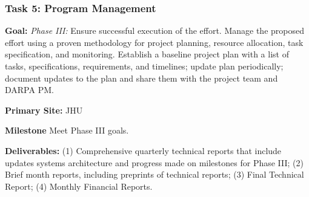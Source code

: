 \subsubsection{Task 5: Program Management}
\begin{compactitem}
\item \textbf{Goal:} \emph{Phase III:} Ensure successful execution of the effort. Manage the proposed effort using a proven methodology for project planning, resource allocation, task specification, and monitoring. Establish a baseline project plan with a list of tasks, specifications, requirements, and timelines; update plan periodically; document updates to the plan and share them with the project team and DARPA PM.
\item \textbf{Primary Site:} JHU
\item \textbf{Milestone} Meet Phase III goals.
\item \textbf{Deliverables:} 
(1) Comprehensive quarterly technical reports that include updates systems architecture and progress made on milestones for Phase III;
(2) Brief month reports, including preprints of technical reports;
(3) Final Technical Report;
(4) Monthly Financial Reports.
\end{compactitem}
